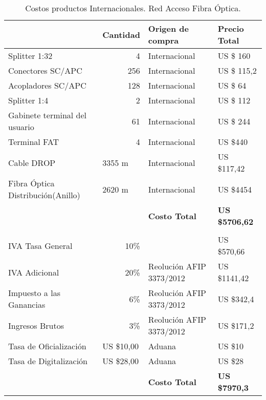\begin{table}[H]
  \centering

    \begin{tabular}{rr|l|l|}
    \hline
    \rowcolor[HTML]{C5D9F1} \multicolumn{1}{|l|}{\textbf{Descripción }} & \multicolumn{1}{l|}{\textbf{Cantidad}} & \textbf{Origen de compra} & \textbf{Precio Total} \bigstrut\\
    \hline
    \multicolumn{1}{|l|}{Splitter 1:32} & 4     & Internacional & US \$ 160 \bigstrut\\
    \hline
    \multicolumn{1}{|l|}{Conectores SC/APC} & 256   & Internacional & US \$ 115,2 \bigstrut\\
    \hline
    \multicolumn{1}{|l|}{Acopladores SC/APC} & 128   & Internacional & US \$ 64 \bigstrut\\
    \hline
    \multicolumn{1}{|l|}{Splitter 1:4} & 2     & Internacional & US \$ 112 \bigstrut\\
    \hline
    \multicolumn{1}{|l|}{Gabinete terminal del usuario} & 61    & Internacional & US \$ 244 \bigstrut\\
    \hline
    \multicolumn{1}{|l|}{Terminal FAT} & 4     & Internacional & US \$440 \bigstrut\\
    \hline
    \multicolumn{1}{|l|}{Cable DROP} & \multicolumn{1}{l|}{3355 m} & Internacional & US \$117,42 \bigstrut\\
    \hline
    \multicolumn{1}{|l|}{Fibra Óptica Distribución(Anillo)} & \multicolumn{1}{l|}{2620 m} & Internacional & US \$4454 \bigstrut\\
    \hline
    \multicolumn{1}{|r|}{} &       & \textbf{Costo Total} & \textbf{US \$5706,62} \bigstrut\\
    \hline
    \rowcolor[HTML]{C5D9F1} \multicolumn{1}{l}{\textbf{Costo de Importación}} & \multicolumn{1}{r}{} & \multicolumn{1}{r}{} & \multicolumn{1}{r}{} \bigstrut\\
    \hline
    \multicolumn{1}{|l|}{IVA Tasa General} & 10\%  &       & US \$570,66 \bigstrut\\
    \hline
    \multicolumn{1}{|l|}{IVA Adicional} & 20\%  & Reolución AFIP 3373/2012 & US \$1141,42 \bigstrut\\
    \hline
    \multicolumn{1}{|l|}{Impuesto a las Ganancias} & 6\%   & Reolución AFIP 3373/2012 & US \$342,4 \bigstrut\\
    \hline
    \multicolumn{1}{|l|}{Ingresos Brutos} & 3\%   & Reolución AFIP 3373/2012 & US \$171,2 \bigstrut\\
    \hline
    \multicolumn{1}{|l|}{Tasa de Oficialización} & \multicolumn{1}{l|}{US \$10,00} & Aduana & US \$10 \bigstrut\\
    \hline
    \multicolumn{1}{|l|}{Tasa de Digitalización} & \multicolumn{1}{l|}{US \$28,00} & Aduana & US \$28 \bigstrut\\
    \hline
          &       & \cellcolor[HTML]{C5D9F1}\textbf{Costo Total} & \cellcolor[HTML]{C5D9F1}\textbf{US \$7970,3} \bigstrut\\
\cline{3-4}    \end{tabular}%
   \caption{Costos productos Internacionales. Red Acceso Fibra Óptica.}
  \label{tab:Costosbf}%
\end{table}%
